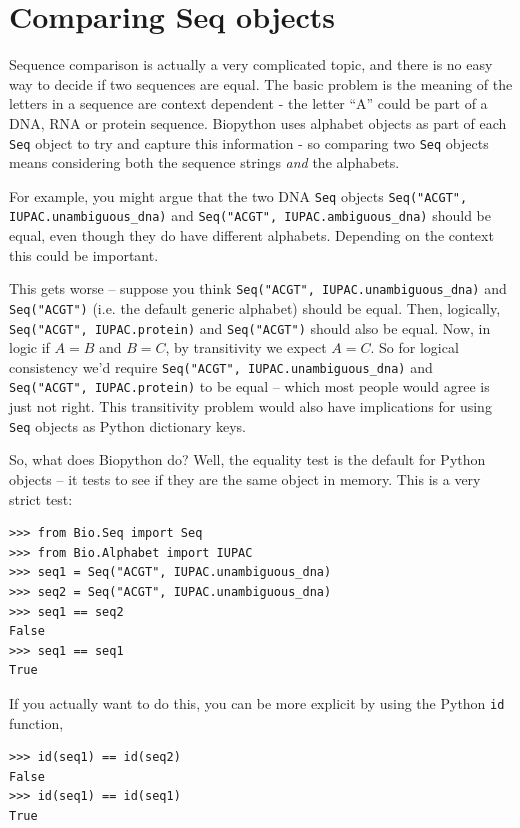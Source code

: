 \documentclass{report}
\begin{document}
\section{Comparing Seq objects}
\label{sec:seq-comparison}

Sequence comparison is actually a very complicated topic, and there is no easy
way to decide if two sequences are equal. The basic problem is the meaning of
the letters in a sequence are context dependent - the letter ``A'' could be part
of a DNA, RNA or protein sequence. Biopython uses alphabet objects as part of
each \verb|Seq| object to try and capture this information - so comparing two
\verb|Seq| objects means considering both the sequence strings \emph{and} the
alphabets.

For example, you might argue that the two DNA \verb|Seq| objects
\texttt{Seq("ACGT", IUPAC.unambiguous\_dna)} and
\texttt{Seq("ACGT", IUPAC.ambiguous\_dna)} should be equal, even though
they do have different alphabets. Depending on the context this could be
important.

This gets worse -- suppose you think \texttt{Seq("ACGT",
IUPAC.unambiguous\_dna)} and \texttt{Seq("ACGT")} (i.e. the default generic
alphabet) should be equal. Then, logically, \texttt{Seq("ACGT", IUPAC.protein)}
and \texttt{Seq("ACGT")} should also be equal. Now, in logic if $A=B$ and
$B=C$, by transitivity we expect $A=C$. So for logical consistency we'd
require \texttt{Seq("ACGT", IUPAC.unambiguous\_dna)} and \texttt{Seq("ACGT",
IUPAC.protein)} to be equal -- which most people would agree is just not right.
This transitivity problem would also have implications for using \verb|Seq|
objects as Python dictionary keys.

So, what does Biopython do? Well, the equality test is the default for Python
objects -- it tests to see if they are the same object in memory. This is a
very strict test:
\begin{verbatim}
>>> from Bio.Seq import Seq
>>> from Bio.Alphabet import IUPAC
>>> seq1 = Seq("ACGT", IUPAC.unambiguous_dna)
>>> seq2 = Seq("ACGT", IUPAC.unambiguous_dna)
>>> seq1 == seq2
False
>>> seq1 == seq1
True
\end{verbatim}

If you actually want to do this, you can be more explicit by using the Python
\verb|id| function,
\begin{verbatim}
>>> id(seq1) == id(seq2)
False
>>> id(seq1) == id(seq1)
True
\end{verbatim}
\end{document}
